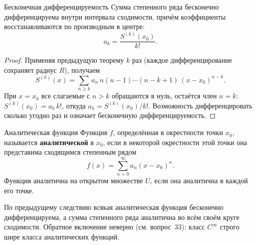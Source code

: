 \begin{Corollary}{Бесконечная дифференцируемость}{}
	Сумма степенного ряда бесконечно дифференцируема внутри интервала сходимости, причём коэффициенты восстанавливаются по производным в центре:
	\[
	a_k = \frac{S^{(k)}(x_0)}{k!}.
	\]
\end{Corollary}

\begin{proof}
	Применяя предыдущую теорему $k$ раз (каждое дифференцирование сохраняет радиус $R$), получаем
	\[
	S^{(k)}(x) = \sum_{n \ge k} a_n\, n(n-1)\cdots(n - k + 1)\,(x - x_0)^{n-k}.
	\]
	При $x = x_0$ все слагаемые с $n > k$ обращаются в нуль, остаётся член $n = k$: $S^{(k)}(x_0) = a_k\, k!$, откуда $a_k = S^{(k)}(x_0)/k!$. Возможность дифференцировать сколько угодно раз и означает бесконечную дифференцируемость.
\end{proof}

\begin{Definition}{Аналитическая функция}{}
	Функция $f$, определённая в окрестности точки $x_0$, называется \textbf{аналитической} в $x_0$, если в некоторой окрестности этой точки она представима сходящимся степенным рядом
	\[
	f(x) = \sum_{n=0}^{\infty} a_n (x - x_0)^n.
	\]
	Функция аналитична на открытом множестве $U$, если она аналитична в каждой его точке. %
\end{Definition}

\begin{Remark}{}{}
	По предыдущему следствию всякая аналитическая функция бесконечно дифференцируема, а сумма степенного ряда аналитична во всём своём круге сходимости. Обратное включение неверно (см. вопрос~33): класс $C^\infty$ строго шире класса аналитических функций.
\end{Remark}
